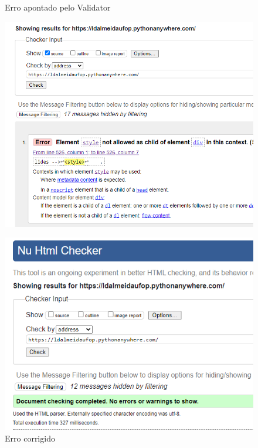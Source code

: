 \begin{figure}[htb]
    \label{teste}
    \centering
     \begin{minipage}{0.4\textwidth}
       \centering
       \caption{Erro apontado pelo Validator} \label{fig_minipage_imagem1}
       \includegraphics[scale=0.3]{./img/validator_error.png}
     \end{minipage}
     \hfill
     \begin{minipage}{0.4\textwidth}
        \centering
        \caption{Erro corrigido} \label{fig_minipage_imagem2}
        \includegraphics[scale=0.3]{./img/validator_sucess.png}
      \end{minipage}
   \end{figure}


